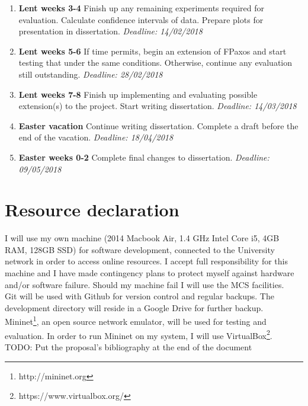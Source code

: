 \begin{enumerate}
  \item {\bf{}Lent weeks 3-4} Finish up any remaining experiments required for evaluation. Calculate confidence intervals of data. Prepare plots for presentation in dissertation.{\em{} Deadline: 14/02/2018}
  
    \item {\bf{}Lent weeks 5-6} If time permits, begin an extension of FPaxos and start testing that under the same conditions. Otherwise, continue any evaluation still outstanding.{\em{} Deadline: 28/02/2018}

  \item {\bf{}Lent weeks 7-8} Finish up implementing and evaluating possible extension(s) to the project. Start writing dissertation.{\em{} Deadline: 14/03/2018}
  
  \item {\bf{}Easter vacation} Continue writing dissertation. Complete a draft before the end of the vacation.{\em{} Deadline: 18/04/2018}
  
  \item {\bf{}Easter weeks 0-2} Complete final changes to dissertation.{\em{} Deadline: 09/05/2018}
\end{enumerate}

\section*{Resource declaration}
I will use my own machine (2014 Macbook Air, 1.4 GHz Intel Core i5, 4GB RAM, 128GB SSD) for software development, connected to the University network in order to access online resources. I accept full responsibility for this machine and I have made contingency plans to protect myself against hardware and/or software failure. Should my machine fail I will use the MCS facilities.  \\

Git will be used with Github for version control and regular backups. The development directory will reside in a Google Drive for further backup. \\

Mininet\footnote{http://mininet.org}, an open source network emulator, will be used for testing and evaluation. In order to run Mininet on my system, I will use VirtualBox\footnote{https://www.virtualbox.org/}. \\

{\color{red} TODO: Put the proposal's bibliography at the end of the document}

%
% 